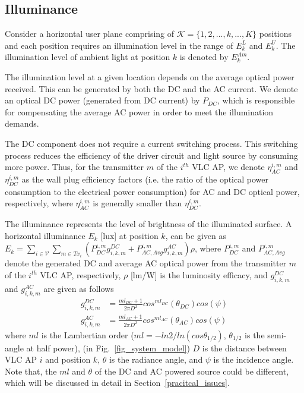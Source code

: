\documentclass[10pt,journal]{IEEEtran}
\begin{document}
\subsection{Illuminance}
Consider a horizontal user plane comprising of $\mathcal{K}=\{1,2,...,k,...,K\}$ positions and each position requires an illumination level in the range of $E_{k}^{L}$ and $E_{k}^{U}$. The illumination level of ambient light at position $k$ is denoted by $E_{k}^{Am}$.

The illumination level at a given location depends on the average optical power received. This can be generated by both the DC and the AC current. We denote an optical DC power (generated from DC current) by $P_{DC}$, which is responsible for compensating the average AC power in order to meet the illumination demands.

The DC component does not require a current switching process. This switching process reduces the efficiency of the driver circuit and light source by consuming more power. Thus, for the transmitter $m$ of the $i^{th}$ VLC AP, we denote $\eta_{AC}^{i,m}$ and $\eta_{DC}^{i,m}$ as the wall plug efficiency factors (i.e. the ratio of the optical power consumption to the electrical power consumption) for AC and DC optical power, respectively, where $\eta_{AC}^{i,m}$ is generally smaller than $\eta_{DC}^{i,m}$.

The illuminance represents the level of brightness of the illuminated surface. A horizontal illuminance $E_{k}$ [lux] at position $k$, can be given \cite{din2014energy} as $E_{k}=\sum_{i\in\mathcal{V}}\sum_{m\in Tx_{i}}(P_{DC}^{i,m}g_{i,k,m}^{DC}+P_{AC,Avg}^{i,m}g_{i,k,m}^{AC})\rho$, where $P_{DC}^{i,m}$ and $P_{AC,Avg}^{i,m}$ denote the generated DC and average AC optical power from the transmitter $m$ of the $i^{th}$ VLC AP, respectively, $\rho$ [lm/W] is the luminosity efficacy, and $g_{i,k,m}^{DC}$ and $g_{i,k,m}^{AC}$ are given as follows
\begin{align}
g_{i,k,m}^{DC}&=\frac{ml_{DC}+1}{2\pi D^{2}}cos^{ml_{DC}}(\theta_{DC})cos(\psi)\nonumber\\
g_{i,k,m}^{AC}&=\frac{ml_{AC}+1}{2\pi D^{2}}cos^{ml_{AC}}(\theta_{AC})cos(\psi)\nonumber
\end{align}
where $ml$ is the Lambertian order ($ml=-ln2/ln(cos\theta_{1/2})$, $\theta_{1/2}$ is the semi-angle at half power), (in Fig.~\ref{fig_system_model}) $D$ is the distance between VLC AP $i$ and position $k$, $\theta$ is the radiance angle, and $\psi$ is the incidence angle. Note that, the $ml$ and $\theta$ of the DC and AC powered source could be different, which will be discussed in detail in Section~\ref{pracitcal_issues}.
\end{document}
